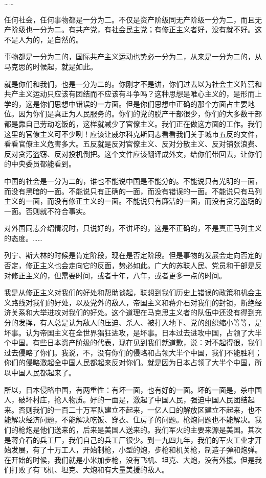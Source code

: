 ……

任何社会，任何事物都是一分为二。不仅是资产阶级同无产阶级一分为二，而且无产阶级也一分为二。有共产党，有社会民主党；有修正主义者好，没有就不好。这不是人为的，是自然的。

事物都是一分为二的，国际共产主义运动也势必一分为二，从来是一分为二的，从马克思的时候起，就是如此。

就是你们和我们，也是一分为二的。你刚才不是讲，你们过去以为社会主义阵营和共产主义运动只应该有团结而不应该有斗争吗？这种思想是唯心主义的，是形而上学的，这是你们思想中错误的一方面。但是你们思想中正确的那个方面占主要地位。因为你们是真正为人民服务的。你们的党的脱产干部很少，你们的大多数干部都是靠自己劳动吃饭的，这样就减少了官僚主义。我们正在做这方面的工作。我们这里的官僚主义可不少咧！应该让威尔科克斯同志看看我们关于城市五反的文件，看看官僚主义危害多大。五反就是反对官僚主义、反对分散主义、反对铺张浪费、反对贪污盗窃、反对投机倒把。这个文件应该翻译成外文，给你们带回去，让你们的中央委员都能看到。

中国的社会是一分为二的，谁也不能说中国是不能分的。不能说只有光明的一面，而没有黑暗的一面。不能说只有正确的一面，而没有错误的一面。不能说只有马列主义的一面，而没有修正主义的一面。不能说只有廉洁的一面，而没有贪污盗窃的一面。否则就不符合事实。

对外国同志介绍情况时，只说好的，不讲坏的，这是不正确的，不是真正马列主义的态度。……

列宁、斯大林的时候是肯定阶段，现在是否定阶段。但是事物的发展会走向否定的否定，修正主义也会走向它的反面，势必如此。广大的苏联人民、党员和干部是反对修正主义的，但需要时间，或者十年，八年，或者更多一点的时间。

我是从修正主义对我们的好处和帮助谈起，联想到我们历史上错误的政策和机会主义路线对我们的好处，以及党外的敌人，帝国主义和蒋介石对我们的封锁，断绝经济关系和大举进攻对我们的好处。这个道理在马克思主义者的队伍中还没有得到充分的发挥，有人总是认为敌人的压迫、杀人、被打入地下、党的组织缩小等等，是坏事。认为帝国主义在全世界猖狂进攻，是坏事。日本过去进攻中国，占领了大半个中国。有些日本资产阶级的代表，现在见到我们就道歉，说：对不起得很，我们过去侵略了你们。我说，不，没有你们的侵略和占领大半个中国，我们不能胜利；你们的侵略激起全中国人民都起来反对你们。就是因为日本占领了大半个中国，所以中国人民都起来了。

所以，日本侵略中国，有两重性：有坏一面，也有好的一面。坏的一面是，杀中国人，破坏村庄，抢人物质。好的一面是，激起了中国人民，强迫中国人民团结起来。否则我们的一百二十万军队建立不起来，一亿人口的解放区建立不起来，也不能解决经济问题，不能解决吃饭、穿衣、住房子的问题。枪炮问题也不能解决。我们的枪炮是他们送来的，后来是美国人送来的。我们军火的主要来源是美国。其次是蒋介石的兵工厂，我们自己的兵工厂很少。到一九四九年，我们的军火工业才开始发展，有了十万工人，开始制枪，小型的炮，步枪和机关枪，制造子弹和炮弹。在开始的时候，我们就是小米加步枪，没有飞机、坦克、大炮，没有外援。但是我们打败了有飞机、坦克、大炮和有大量美援的敌人。

